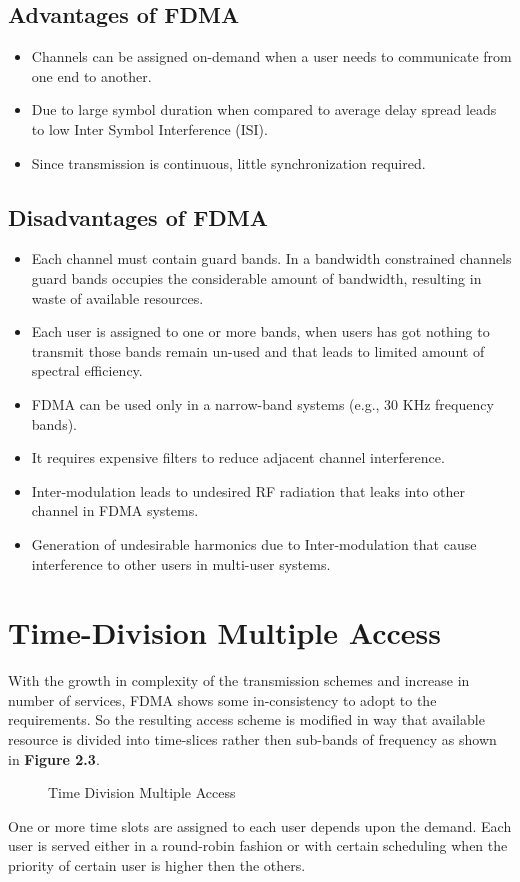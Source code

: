 \subsection{Advantages of FDMA}
\begin{itemize}
\item Channels can be assigned on-demand when a user needs to communicate from one end to another.
\item Due to large symbol duration when compared to average delay spread leads to low Inter Symbol Interference (ISI).
\item Since transmission is continuous, little synchronization required.
\end{itemize}
\subsection{Disadvantages of FDMA}
\begin{itemize}
\item Each channel must contain guard bands. In a bandwidth constrained channels guard bands occupies the considerable amount of bandwidth, resulting in waste of available resources.
\item Each user is assigned to one or more bands, when users has got nothing to transmit those bands remain un-used and that leads to limited amount of spectral efficiency.
\item FDMA can be used only in a narrow-band systems (e.g., 30 KHz frequency bands).
\item It requires expensive filters to reduce adjacent channel interference.
\item Inter-modulation leads to undesired RF radiation that leaks into other channel in FDMA systems.
\item Generation of undesirable harmonics due to Inter-modulation that cause interference to other users in multi-user systems.
\end{itemize}
\section{Time-Division Multiple Access}
With the growth in complexity of the transmission schemes and increase in number of services, FDMA shows some in-consistency to adopt to the requirements. So the resulting access scheme is modified in way that available resource is divided into time-slices rather then sub-bands of frequency as shown in \textbf{Figure 2.3}.
\begin{figure}[htb]
  \centerline{  }
  \caption{Time Division Multiple Access}
\end{figure}
One or more time slots are assigned to each user depends upon the demand. Each user is served either in a round-robin fashion or with certain scheduling when the priority of certain user is higher then the others.
